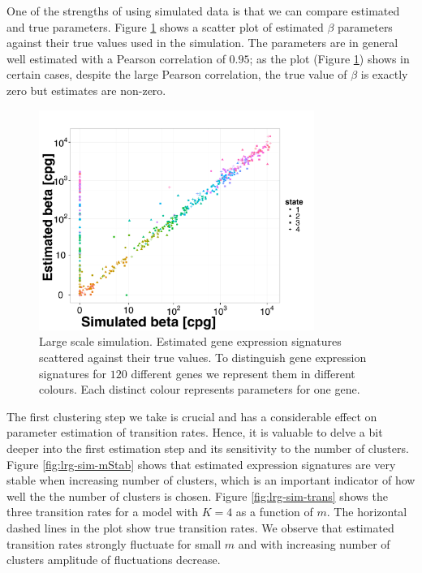 One of the strengths of using simulated data is that we can compare estimated and true parameters. Figure \ref{fig:lrg-sim-scatter-b} shows a scatter plot of estimated $\beta$ parameters against their true values used in the simulation. The parameters are in general well estimated with a Pearson correlation of $0.95$; as the plot (Figure \ref{fig:lrg-sim-scatter-b}) shows in certain cases, despite the large Pearson correlation, the true value of $\beta$ is exactly zero but estimates are non-zero.

\begin{figure}[!h]
  \centering
  \includegraphics[width=0.8\textwidth]{pics/beta-sim.pdf}
  \caption{Large scale simulation. Estimated gene expression signatures scattered against their true values. To distinguish gene expression signatures for $120$ different genes we represent them in different colours. Each distinct colour represents parameters for one gene.}
  \label{fig:lrg-sim-scatter-b}
\end{figure}

The first clustering step we take is crucial and has a considerable effect on parameter estimation of transition rates. Hence, it is valuable to delve a bit deeper into the first estimation step and its sensitivity to the number of clusters. Figure \ref{fig:lrg-sim-mStab} shows that estimated expression signatures are very stable when increasing number of clusters, which is an important indicator of how well the the number of clusters is chosen. Figure \ref{fig:lrg-sim-trans} shows the three transition rates for a model with $K=4$ as a function of $m$. The horizontal dashed lines in the plot show true transition rates. We observe that estimated transition rates strongly fluctuate for small $m$ and with increasing number of clusters amplitude of fluctuations decrease.

